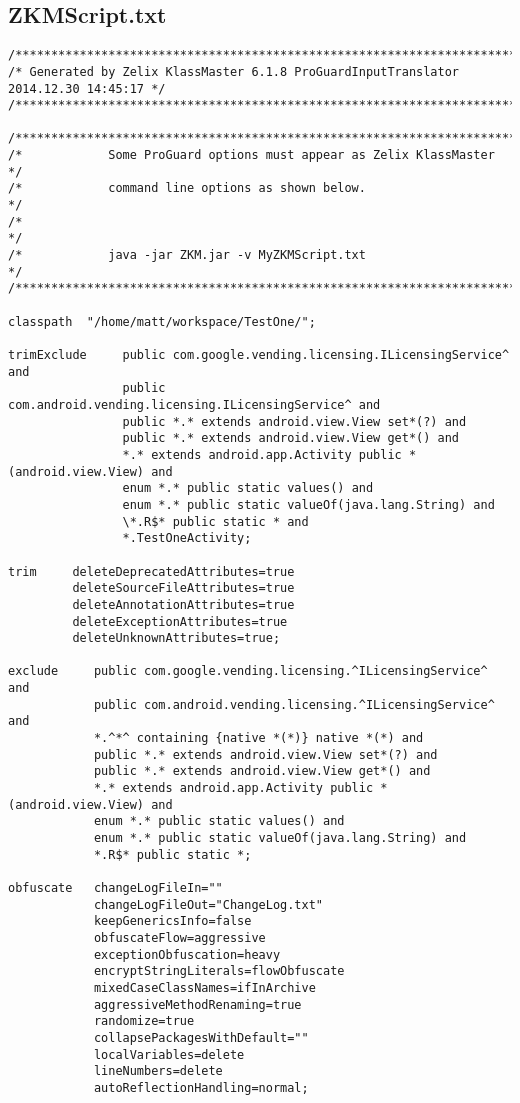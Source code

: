 \subsection{ZKMScript.txt}
\label{app:oz}
\begin{lstlisting}
/************************************************************************************/
/* Generated by Zelix KlassMaster 6.1.8 ProGuardInputTranslator 2014.12.30 14:45:17 */
/************************************************************************************/

/************************************************************************************/
/*            Some ProGuard options must appear as Zelix KlassMaster                */
/*            command line options as shown below.                                  */
/*                                                                                  */
/*            java -jar ZKM.jar -v MyZKMScript.txt                                  */
/************************************************************************************/

classpath  "/home/matt/workspace/TestOne/";

trimExclude     public com.google.vending.licensing.ILicensingService^ and
                public com.android.vending.licensing.ILicensingService^ and
                public *.* extends android.view.View set*(?) and
                public *.* extends android.view.View get*() and
                *.* extends android.app.Activity public *(android.view.View) and
                enum *.* public static values() and
                enum *.* public static valueOf(java.lang.String) and
                \*.R$* public static * and
                *.TestOneActivity;

trim     deleteDeprecatedAttributes=true
         deleteSourceFileAttributes=true
         deleteAnnotationAttributes=true
         deleteExceptionAttributes=true
         deleteUnknownAttributes=true;

exclude     public com.google.vending.licensing.^ILicensingService^ and
            public com.android.vending.licensing.^ILicensingService^ and
            *.^*^ containing {native *(*)} native *(*) and
            public *.* extends android.view.View set*(?) and
            public *.* extends android.view.View get*() and
            *.* extends android.app.Activity public *(android.view.View) and
            enum *.* public static values() and
            enum *.* public static valueOf(java.lang.String) and
            *.R$* public static *;

obfuscate   changeLogFileIn=""
            changeLogFileOut="ChangeLog.txt"
            keepGenericsInfo=false
            obfuscateFlow=aggressive
            exceptionObfuscation=heavy
            encryptStringLiterals=flowObfuscate
            mixedCaseClassNames=ifInArchive
            aggressiveMethodRenaming=true
            randomize=true
            collapsePackagesWithDefault=""
            localVariables=delete
            lineNumbers=delete
            autoReflectionHandling=normal;
\end{lstlisting}
